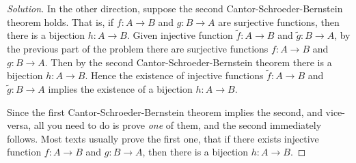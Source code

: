 \documentclass{article}
\theoremstyle{normal}
\begin{document}
\begin{proof}[Solution]
        \par\hfill\par
        In the other direction, suppose the second Cantor-Schroeder-Bernstein
        theorem holds. That is, if $f:A\rightarrow{B}$ and $g:B\rightarrow{A}$
        are surjective functions, then there is a bijection $h:A\rightarrow{B}$.
        Given injective function $\tilde{f}:A\rightarrow{B}$ and
        $\tilde{g}:B\rightarrow{A}$, by the previous part of the problem there
        are surjective functions $f:A\rightarrow{B}$ and $g:B\rightarrow{A}$.
        Then by the second Cantor-Schroeder-Bernstein theorem there is a
        bijection $h:A\rightarrow{B}$. Hence the existence of injective
        functions $\tilde{f}:A\rightarrow{B}$ and $\tilde{g}:B\rightarrow{A}$
        implies the existence of a bijection $h:A\rightarrow{B}$.
        \par\hfill\par
        Since the first Cantor-Schroeder-Bernstein theorem implies the second,
        and vice-versa, all you need to do is prove \textit{one} of them, and
        the second immediately follows. Most texts usually prove the first one,
        that if there exists injective function $f:A\rightarrow{B}$ and
        $g:B\rightarrow{A}$, then there is a bijection $h:A\rightarrow{B}$.
    \end{proof}
    \newpage
    \color{blue}
\end{document}
